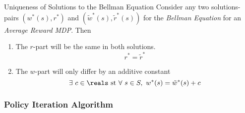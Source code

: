 \documentclass[11pt,a4paper]{article}
\begin{document}
  \begin{theorem}{Uniqueness of Solutions to the Bellman Equation}
    Consider any two solutions-pairs $(w^*(s),r^*)$ and $(\tilde{w}^*(s),\tilde{r}^*(s))$ for the \textit{Bellman Equation} for an \textit{Average Reward MDP}. Then
    \begin{enumerate}
      \item The $r$-part will be the same in both solutions.
      \[ r^*=\tilde{r}^* \]
      \item The $w$-part will only differ by an additive constant
      \[ \exists\ c\in\reals\text{ st }\forall\ s\in S,\ w^*(s)=\tilde{w}^*(s)+c \]
    \end{enumerate}
  \end{theorem}

\subsubsection{Policy Iteration Algorithm}
\end{document}
